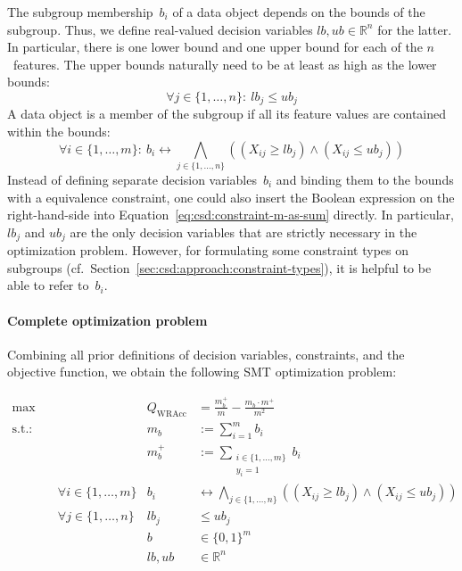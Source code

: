 \documentclass{article}
\theoremstyle{definition}
\begin{document}
The subgroup membership~$b_i$ of a data object depends on the bounds of the subgroup.
Thus, we define real-valued decision variables $\mathit{lb}, \mathit{ub} \in \mathbb{R}^n$ for the latter.
In particular, there is one lower bound and one upper bound for each of the $n$~features.
The upper bounds naturally need to be at least as high as the lower bounds:
%
\begin{equation}
	\forall j \in \{1, \dots, n\}:~ \mathit{lb}_j\leq \mathit{ub}_j
	\label{eq:csd:constraint-bounds-monotonic}
\end{equation}
%
A data object is a member of the subgroup if all its feature values are contained within the bounds:
%
\begin{equation}
	\forall i \in \{1, \dots, m\}:~ b_i\leftrightarrow \bigwedge_{j \in \{1, \dots, n\}} \left( \left( X_{ij} \geq \mathit{lb}_j \right) \land \left( X_{ij} \leq \mathit{ub}_j \right) \right)
	\label{eq:csd:constraint-subgroup-membership}
\end{equation}
%
Instead of defining separate decision variables~$b_i$ and binding them to the bounds with a equivalence constraint, one could also insert the Boolean expression on the right-hand-side into Equation~\ref{eq:csd:constraint-m-as-sum} directly.
In particular, $\mathit{lb}_j$ and $\mathit{ub}_j$ are the only decision variables that are strictly necessary in the optimization problem.
However, for formulating some constraint types on subgroups (cf.~Section~\ref{sec:csd:approach:constraint-types}), it is helpful to be able to refer to~$b_i$.

\paragraph{Complete optimization problem}

Combining all prior definitions of decision variables, constraints, and the objective function, we obtain the following SMT optimization problem:

\begin{equation}
	\begin{aligned}
		\max &\quad & Q_{\text{WRAcc}} &= \frac{m_b^+}{m} - \frac{m_b \cdot m^+}{m^2} \\
		\text{s.t.:} &\quad & m_b &:= \sum_{i=1}^{m} b_i \\
		&\quad & m_b^+ &:= \sum_{\substack{i \in \{1, \dots, m\} \\ y_i = 1 }} b_i \\
		&\quad \forall i \in \{1, \dots, m\} & b_i &\leftrightarrow \bigwedge_{j \in \{1, \dots, n\}} \left( \left( X_{ij} \geq \mathit{lb}_j \right) \land \left( X_{ij} \leq \mathit{ub}_j \right) \right) \\
		&\quad \forall j \in \{1, \dots, n\} & \mathit{lb}_j &\leq \mathit{ub}_j \\
		&\quad & b &\in \{0, 1\}^m \\
		&\quad & \mathit{lb}, \mathit{ub} &\in \mathbb{R}^n
	\end{aligned}
	\label{eq:csd:smt-unconstrained-complete}
\end{equation}
\end{document}
